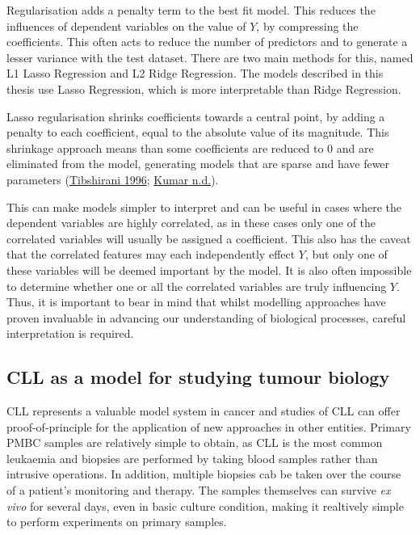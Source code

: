 \documentclass[11pt, a4paper, twosided]{book}
\begin{document}
Regularisation adds a penalty term to the best fit model. This reduces the influences of dependent variables on the value of \(Y\), by compressing the coefficients. This often acts to reduce the number of predictors and to generate a lesser variance with the test dataset. There are two main methods for this, named L1 Lasso Regression and L2 Ridge Regression. The models described in this thesis use Lasso Regression, which is more interpretable than Ridge Regression.

Lasso regularisation shrinks coefficients towards a central point, by adding a penalty to each coefficient, equal to the absolute value of its magnitude. This shrinkage approach means than some coefficients are reduced to 0 and are eliminated from the model, generating models that are sparse and have fewer parameters (\protect\hyperlink{ref-Tibshirani1996}{Tibshirani 1996}; \protect\hyperlink{ref-Kumar}{Kumar n.d.}).

This can make models simpler to interpret and can be useful in cases where the dependent variables are highly correlated, as in these cases only one of the correlated variables will usually be assigned a coefficient. This also has the caveat that the correlated features may each independently effect \(Y\), but only one of these variables will be deemed important by the model. It is also often impossible to determine whether one or all the correlated variables are truly influencing \(Y\). Thus, it is important to bear in mind that whilst modelling approaches have proven invaluable in advancing our understanding of biological processes, careful interpretation is required.

\hypertarget{CLL-model-intro}{%
\subsection{CLL as a model for studying tumour biology}\label{CLL-model-intro}}

CLL represents a valuable model system in cancer and studies of CLL can offer proof-of-principle for the application of new approaches in other entities. Primary PMBC samples are relatively simple to obtain, as CLL is the most common leukaemia and biopsies are performed by taking blood samples rather than intrusive operations. In addition, multiple biopsies cab be taken over the course of a patient's monitoring and therapy. The samples themselves can survive \emph{ex vivo} for several days, even in basic culture condition, making it realtively simple to perform experiments on primary samples.
\end{document}
